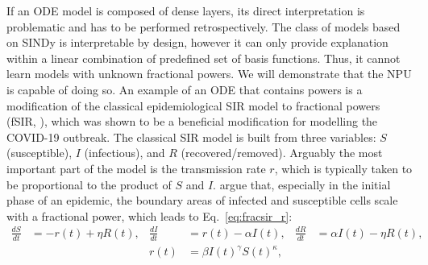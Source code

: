 \documentclass[9pt]{article}
\begin{document}
If an ODE model is composed of dense layers, its direct interpretation is
problematic and has to be performed retrospectively. The class of models based on
SINDy is interpretable by design, however it can only provide explanation
within a linear combination of predefined set of basis functions. Thus, it
cannot learn models with unknown fractional powers. We will demonstrate that the NPU
is capable of doing so.
An example of an ODE that contains powers is a modification of the classical
epidemiological SIR model \citep{kermack_contribution_1927} to fractional powers
(fSIR, \cite{taghvaei_fractional_2020}), which was shown to be a beneficial
modification for modelling the COVID-19 outbreak.  The classical SIR model is
built from three variables: $S$ (susceptible), $I$ (infectious), and $R$
(recovered/removed).  Arguably the most important part of the model is the
transmission rate $r$, which is typically taken to be proportional to the
product of $S$ and $I$.  \citet{taghvaei_fractional_2020} argue that,
especially in the initial phase of an epidemic, the boundary areas of infected
and susceptible cells scale with a fractional power, which leads to
Eq.~\ref{eq:fracsir_r}:
\begin{align}
  \label{eq:fracsir}
  \frac{dS}{dt} &= -r(t) + \eta R(t), &
  \frac{dI}{dt} &=  r(t) - \alpha I(t), &
  \frac{dR}{dt} &= \alpha I(t) - \eta R(t),\\
  \label{eq:fracsir_r}
  & & r(t) &= \beta I(t)^\gamma S(t)^\kappa,
\end{align}
\end{document}
